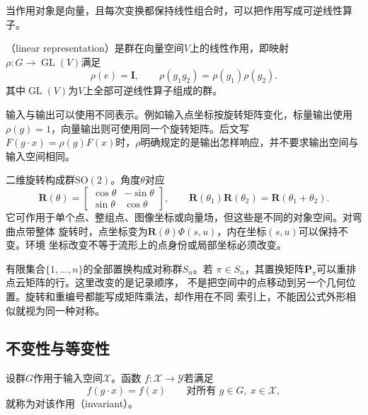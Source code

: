 当作用对象是向量，且每次变换都保持线性组合时，可以把作用写成可逆线性算子。

\begin{definition}[线性表示]
\label{def:geometry-linear-representation}
（linear representation）是群在向量空间$V$上的线性作用，即映射
$\rho:G\to\operatorname{GL}(V)$满足
\begin{equation}
  \rho(e)=\bm{I},
  \qquad
  \rho(g_1g_2)=\rho(g_1)\rho(g_2).
  \label{eq:geometry-linear-representation}
\end{equation}
其中$\operatorname{GL}(V)$为$V$上全部可逆线性算子组成的群。
\end{definition}
输入与输出可以使用不同表示。例如输入点坐标按旋转矩阵变化，标量输出使用
$\rho(g)=1$，向量输出则可使用同一个旋转矩阵。后文写
$F(g\cdot x)=\rho(g)F(x)$时，$\rho$明确规定的是输出怎样响应，并不要求输出空间与
输入空间相同。

二维旋转构成群$\mathrm{SO}(2)$。角度$\theta$对应
\begin{equation}
  \bm{R}(\theta)
  =
  \begin{bmatrix}
    \cos\theta&-\sin\theta\\
    \sin\theta&\cos\theta
  \end{bmatrix},
  \qquad
  \bm{R}(\theta_1)\bm{R}(\theta_2)
  =
  \bm{R}(\theta_1+\theta_2).
  \label{eq:geometry-planar-rotation-group}
\end{equation}
它可作用于单个点、整组点、图像坐标或向量场，但这些是不同的对象空间。对弯曲点带整体
旋转时，点坐标变为$\bm{R}(\theta)\Phi(s,u)$，内在坐标$(s,u)$可以保持不变。环境
坐标改变不等于流形上的点身份或局部坐标必须改变。

有限集合$\{1,\ldots,n\}$的全部置换构成对称群$S_n$。若
$\pi\in S_n$，其置换矩阵$\bm{P}_{\pi}$可以重排点云矩阵的行。这里改变的是记录顺序，
不是把空间中的点移动到另一个几何位置。旋转和重编号都能写成矩阵乘法，却作用在不同
索引上，不能因公式外形相似就视为同一种对称。

\subsection{不变性与等变性}

\begin{definition}[不变映射]
\label{def:geometry-invariant-map}
设群$G$作用于输入空间$\mathcal{X}$。函数
$f:\mathcal{X}\to\mathcal{Y}$若满足
\begin{equation}
  f(g\cdot x)=f(x)
  \qquad
  \text{对所有 }g\in G,\ x\in\mathcal{X},
  \label{eq:geometry-invariant-map}
\end{equation}
就称为对该作用（invariant）。
\end{definition}


